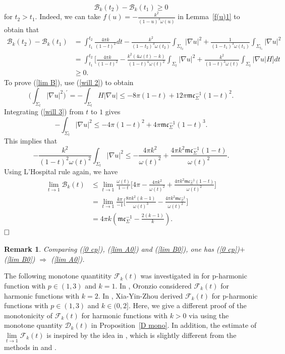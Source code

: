 \documentclass[12pt]{article}
\theoremstyle{definition}
\theoremstyle{plain}
\newtheorem{remark}{Remark}[section]
\numberwithin{equation}{section}
\begin{document}
$$
\mathcal{B}_{k}(t_{2})-\mathcal{B}_{k}(t_{1})\geq0
$$
for $ t_{2}>t_{1} $. Indeed, we can take $ f(u)=-\frac{k^{2}}{(1-u)^{3}\omega(u)} $ in Lemma~\ref{f(u)1} to obtain that
$$
\begin{aligned}
\mathcal{B}_{k}(t_{2})-\mathcal{B}_{k}(t_{1})&=\int_{t_{1}}^{t_{2}}\frac{4\pi k}{(1-t)^{2}}dt-\frac{k^{2}}{(1-t_{2})^{3}\omega(t_{2})}\int_{\Sigma_{t_{2}}}|\nabla u|^{2}+\frac{1}{(1-t_{1})^{3}\omega(t_{1})}\int_{\Sigma_{t_{1}}}|\nabla u|^{2}\\
&=\int_{t_{1}}^{t_{2}}\Big[\frac{4\pi k}{(1-t)^{2}}-\frac{k^{2}(4\omega(t)-k)}{(1-t)^{4}\omega(t)^{2}}\int_{\Sigma_{t}}|\nabla u|^{2}+\frac{k^{2}}{(1-t)^{3}\omega(t)}\int_{\Sigma_{t}}|\nabla u|H\Big]dt\\
&\geq0.
\end{aligned}
$$
To prove (\ref{lim B}), use (\ref{will 2}) to obtain
\begin{equation}\label{will 3}
\Big(\int_{\Sigma_{t}}|\nabla u|^{2}\Big)^{\prime}=-\int_{\Sigma_{t}}H|\nabla u|\leq -8\pi(1-t)+12\pi \mathfrak{m}\mathfrak{c}_{\Sigma}^{-1}(1-t)^{2}.
\end{equation}
Integrating (\ref{will 3}) from $ t $ to $ 1 $ gives
$$
-\int_{\Sigma_{t}}|\nabla u|^{2}\leq -4\pi(1-t)^{2}+4\pi \mathfrak{m}\mathfrak{c}_{\Sigma}^{-1}(1-t)^{3}.
$$
This implies that 
$$
-\frac{k^{2}}{(1-t)^{2}\omega(t)^{2}}\int_{\Sigma_{t}}|\nabla u|^{2}\leq -\frac{4\pi k^{2}}{\omega(t)^{2}}+\frac{4\pi k^{2} \mathfrak{m}\mathfrak{c}_{\Sigma}^{-1}(1-t)}{\omega(t)^{2}}.
$$
Using L'Hospital rule again, we have
$$
\begin{aligned}
\lim\limits_{t\to 1}\mathcal{B}_{k}(t)&\leq \lim\limits_{t\to 1}\frac{\omega(t)}{1-t}\Big[4\pi-\frac{4\pi k^{2}}{\omega(t)^{2}}+\frac{4\pi k^{2} \mathfrak{m}\mathfrak{c}_{\Sigma}^{-1}(1-t)}{\omega(t)^{2}} \Big]\\
&=\lim\limits_{t\to 1}\frac{k\pi}{-1}\Big[\frac{8\pi k^{2}(k-1)}{\omega(t)^{3}}-\frac{4\pi k^{2}\mathfrak{m}\mathfrak{c}_{\Sigma}^{-1}}{\omega(t)^{2}} \Big]\\
&=4\pi k(\mathfrak{m}\mathfrak{c}_{\Sigma}^{-1}-\frac{2(k-1)}{k}).
\end{aligned}
$$
$\hfill\square$
\begin{remark}
Comparing (\ref{0 cp}), (\ref{lim A0}) and (\ref{lim B0}), one has (\ref{0 cp})$+$(\ref{lim B0}) $\Rightarrow$ (\ref{lim A0}).
\end{remark}
The following monotone quantitity $ \mathcal{F}_{k}(t) $ was investigated in \cite{Ag2,Ag3} for p-harmonic function with $ p\in (1,3) $ and $ k=1 $. In \cite{Oronzio}, Oronzio considered $ \mathcal{F}_{k}(t) $ for harmonic functions with $ k=2 $. In \cite{Xia}, Xia-Yin-Zhou derived $ \mathcal{F}_{k}(t) $ for p-harmonic functions with $ p\in (1,3) $ and $ k\in (0,2] $. Here, we give a different proof of the monotonicity of $ \mathcal{F}_{k}(t) $ for harmonic functions with $ k>0 $ via using the monotone quantity $ \mathcal{D}_{k}(t) $ in Proposition~\ref{D mono}. In addition, the estimate of $ \lim\limits_{t\to 1}\mathcal{F}_{k}(t) $ is inspired by the idea in \cite{Ag2}, which is  slightly different from the methods in \cite{Oronzio} and \cite{Xia}.
\end{document}
